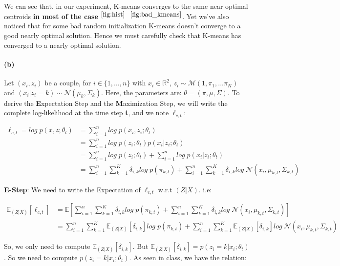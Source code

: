 \documentclass[11pt]{article}
\numberwithin{figure}{section} %
\begin{document}
We can see that, in our experiment, K-means converges to the same near optimal centroids \textbf{in most of the case}$^{~\ref{fig:hist}}$ $^{~\ref{fig:bad_kmeans}}$. Yet we've also noticed that for some bad random initialization K-means doesn't converge to a good nearly optimal solution. Hence we must carefully check that K-means has converged to a nearly optimal solution.

\paragraph{(b)}
Let $(x_i, z_i)$ be a couple, for $i \in \{1, \hdots, n\}$ with $x_i \in \mathbb{R}^2$, $z_i \sim \mathcal{M}(1, \pi_1,... \pi_K)$ and $(x_i | z_i = k) \sim \mathcal{N}(\mu_k, \Sigma_k)$.
Here, the parameters are: $\theta = (\pi, \mu, \Sigma)$. To derive the \textbf{E}xpectation Step and the \textbf{M}aximization Step, we will write the c\textbf{}omplete log-likelihood at the time step \textbf{t}, and we note $\ell_{c,t}$:

\begin{align*}
\ell_{c,t} = log \; p(x, z; \theta_t) &= \sum\limits_{i=1}^n log \; p(x_i, z_i; \theta_t) \\
&= \sum\limits_{i=1}^n log \; p(z_i; \theta_t)p(x_i | z_i; \theta_t) \\
&= \sum\limits_{i=1}^n log \; p(z_i; \theta_t) + \sum\limits_{i=1}^n log \; p(x_i | z_i; \theta_t) \\
&= \sum\limits_{i=1}^n \sum\limits_{k=1}^K \delta_{i, k} log \; p(\pi_{k,t}) + \sum\limits_{i=1}^n \sum\limits_{k=1}^K \delta_{i, k} log \; \mathcal{N}(x_i, \mu_{k,t}, \Sigma_{k,t})
\end{align*}

\textbf{E-Step}: We need to write the Expectation of $\ell_{c,t}$ w.r.t $(Z|X)$. i.e:

\begin{align*}
\mathbb{E}_{(Z|X)}[\ell_{c,t}] &= \mathbb{E}\left[\sum\limits_{i=1}^n \sum\limits_{k=1}^K \delta_{i, k} log \; p(\pi_{k,t}) + \sum\limits_{i=1}^n \sum\limits_{k=1}^K \delta_{i, k} log \; \mathcal{N}(x_i, \mu_{k,t}, \Sigma_{k,t})\right] \\
&= \sum\limits_{i=1}^n \sum\limits_{k=1}^K \mathbb{E}_{(Z|X)}[\delta_{i, k}] log \; p(\pi_{k,t}) + \sum\limits_{i=1}^n \sum\limits_{k=1}^K \mathbb{E}_{(Z|X)}[\delta_{i, k}] log \; \mathcal{N}(x_i, \mu_{k,t}, \Sigma_{k,t})
\end{align*}

So, we only need to compute $\mathbb{E}_{(Z|X)}[\delta_{i, k}]$. But $\mathbb{E}_{(Z|X)}[\delta_{i, k}] = p(z_i = k | x_i; \theta_t)$. So we need to compute $p(z_i = k | x_i; \theta_t)$.
As seen in class, we have the relation:
\end{document}
